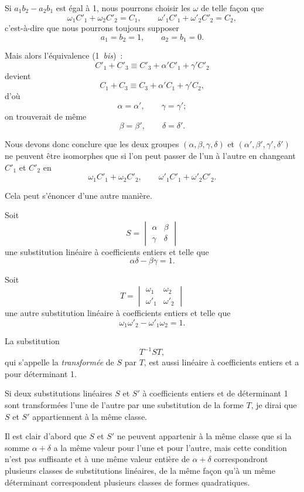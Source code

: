 \documentclass{article}
\begin{document}
Si $a_{1}b_{2} - a_{2}b_{1}$ est égal à 1, nous pourrons choisir les $\omega$ de telle façon que
\[ \omega_{1}C'_{1} + \omega_{2}C'_{2} = C_{1}, \qquad \omega'_{1}C'_{1} + \omega'_{2}C'_{2} = C_{2}, \]
c'est-à-dire que nous pourrons toujours supposer
\[ a_{1} = b_{2} = 1, \qquad a_{2} = b_{1} = 0. \]

Mais alors l'équivalence (1~\emph{bis})~:
\[ C'_{1} + C'_{3} \equiv C'_{3} + \alpha'C'_{1} + \gamma'C'_{2} \]
devient
\[ C_{1} + C_{3} \equiv C_{3} + \alpha'C_{1} + \gamma'C_{2}, \]
d'où
\[ \alpha = \alpha', \qquad \gamma = \gamma'; \]
on trouverait de même
\[ \beta = \beta', \qquad \delta = \delta'. \]

Nous devons donc conclure que les deux groupes $(\alpha, \beta, \gamma, \delta)$ et $(\alpha', \beta', \gamma', \delta')$ ne peuvent être isomorphes que si l'on peut passer de l'un à l'autre en changeant $C'_{1}$ et $C'_{2}$ en
\[ \omega_{1}C'_{1} + \omega_{2}C'_{2}, \qquad \omega'_{1}C'_{1} + \omega'_{2}C'_{2}. \]

Cela peut s'énoncer d'une autre manière.

Soit
\[ S = \begin{vmatrix} \alpha & \beta \\[1ex] \gamma & \delta \end{vmatrix} \]
une substitution linéaire à coefficients entiers et telle que
\[ \alpha\delta - \beta\gamma = 1. \]

Soit
\[ T = \begin{vmatrix} \omega_{1} & \omega_{2} \\[1ex] \omega'_{1} & \omega'_{2} \end{vmatrix} \]
une autre substitution linéaire à coefficients entiers et telle que
\[ \omega_{1}\omega'_{2} - \omega'_{1}\omega_{2} = 1. \]

La substitution
\[ T^{-1}ST, \]
qui s'appelle la \emph{transformée} de $S$ par $T$, est aussi linéaire à coefficients entiers et a pour déterminant 1.

Si deux substitutions linéaires $S$ et $S'$ à coefficients entiers et de déterminant 1 sont transformées l'une de l'autre par une substitution de la forme $T$, je dirai que $S$ et $S'$ appartiennent à la même classe.

Il est clair d'abord que $S$ et $S'$ ne peuvent appartenir à la même classe que si la somme $\alpha + \delta$ a la même valeur pour l'une et pour l'autre, mais cette condition n'est pas suffisante et à une même valeur entière de $\alpha + \delta$ correspondront plusieurs classes de substitutions linéaires, de la même façon qu'à un même déterminant correspondent plusieurs classes de formes quadratiques.
\end{document}
